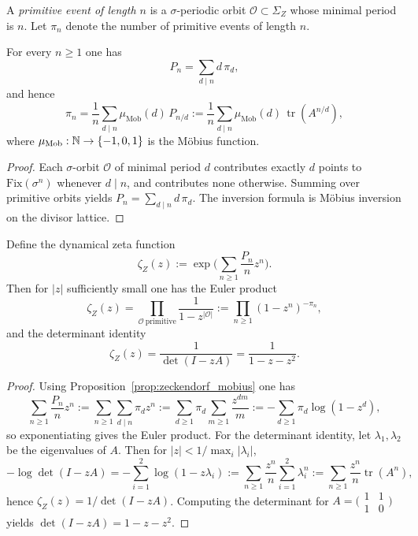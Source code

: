 \begin{definition}
A \emph{primitive event of length $n$} is a $\sigma$-periodic orbit $\mathcal{O}\subset\Sigma_Z$ whose minimal period is $n$. Let $\pi_n$ denote the number of primitive events of length $n$.
\end{definition}

\begin{proposition}
\label{prop:zeckendorf_mobius}
For every $n\ge 1$ one has
$$
P_n=\sum_{d\mid n} d\,\pi_d,
$$
and hence
$$
\pi_n=\frac{1}{n}\sum_{d\mid n}\mu_{\mathrm{Mob}}(d)\,P_{n/d}
:=\frac{1}{n}\sum_{d\mid n}\mu_{\mathrm{Mob}}(d)\,\operatorname{tr}(A^{n/d}),
$$
where $\mu_{\mathrm{Mob}}:\mathbb{N}\to\{-1,0,1\}$ is the M\"obius function.
\end{proposition}

\begin{proof}
Each $\sigma$-orbit $\mathcal{O}$ of minimal period $d$ contributes exactly $d$ points to $\mathrm{Fix}(\sigma^n)$ whenever $d\mid n$, and contributes none otherwise. Summing over primitive orbits yields $P_n=\sum_{d\mid n} d\,\pi_d$. The inversion formula is M\"obius inversion on the divisor lattice.
\end{proof}

\begin{proposition}
\label{prop:zeckendorf_zeta}
Define the dynamical zeta function
$$
\zeta_Z(z):=\exp\Big(\sum_{n\ge 1}\frac{P_n}{n}z^n\Big).
$$
Then for $|z|$ sufficiently small one has the Euler product
$$
\zeta_Z(z)=\prod_{\mathcal{O}\ \mathrm{primitive}}\frac{1}{1-z^{|\mathcal{O}|}}
:=\prod_{n\ge 1}(1-z^n)^{-\pi_n},
$$
and the determinant identity
$$
\zeta_Z(z)=\frac{1}{\det(I-zA)}=\frac{1}{1-z-z^2}.
$$
\end{proposition}

\begin{proof}
Using Proposition~\ref{prop:zeckendorf_mobius} one has
$$
\sum_{n\ge 1}\frac{P_n}{n}z^n
:=\sum_{n\ge 1}\sum_{d\mid n}\pi_d z^n
:=\sum_{d\ge 1}\pi_d\sum_{m\ge 1}\frac{z^{dm}}{m}
:=-\sum_{d\ge 1}\pi_d \log(1-z^d),
$$
so exponentiating gives the Euler product.
For the determinant identity, let $\lambda_1,\lambda_2$ be the eigenvalues of $A$. Then for $|z|<1/\max_i|\lambda_i|$,
$$
-\log\det(I-zA)=-\sum_{i=1}^2\log(1-z\lambda_i)
:=\sum_{n\ge 1}\frac{z^n}{n}\sum_{i=1}^2\lambda_i^n
:=\sum_{n\ge 1}\frac{z^n}{n}\operatorname{tr}(A^n),
$$
hence $\zeta_Z(z)=1/\det(I-zA)$. Computing the determinant for $A=\bigl(\begin{smallmatrix}1&1\\1&0\end{smallmatrix}\bigr)$ yields $\det(I-zA)=1-z-z^2$.
\end{proof}

